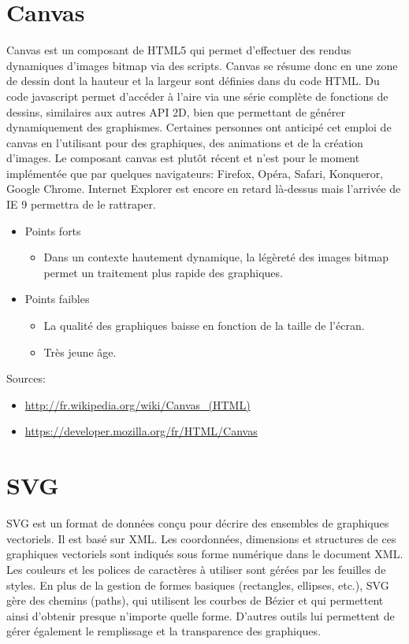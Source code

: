 \documentclass[a4paper,10pt]{report}
\begin{document}
\section{Canvas}
Canvas est un composant de HTML5 qui permet d'effectuer des rendus dynamiques d'images 
bitmap via des scripts.
Canvas se résume donc en une zone de dessin dont la hauteur et la largeur sont définies 
dans du code HTML. Du code javascript permet d'accéder à l'aire via une série complète de fonctions de dessins, 
similaires aux autres API 2D, bien que permettant de générer dynamiquement des graphismes. Certaines personnes ont anticipé cet emploi de canvas en l'utilisant pour des graphiques, des animations et de la création d'images.
Le composant canvas est plutôt récent et n'est pour le moment implémentée que par 
quelques navigateurs: Firefox, Opéra, Safari, Konqueror, Google Chrome. 
Internet Explorer est encore en retard là-dessus mais l'arrivée de IE 9 permettra
 de le rattraper.

\begin{itemize}
  \item{Points forts}
  \begin{itemize}
    \item Dans un contexte hautement dynamique, la légèreté des images bitmap permet un traitement plus rapide des graphiques.
  \end{itemize}
  \item{Points faibles}
  \begin{itemize}
    \item La qualité des graphiques baisse en fonction de la taille de l'écran.
    \item Très jeune âge.
  \end{itemize}
\end{itemize}


 Sources:
\begin{itemize}
\item \url{http://fr.wikipedia.org/wiki/Canvas_(HTML)}
\item \url{https://developer.mozilla.org/fr/HTML/Canvas}
\end{itemize} 
	  

\section{SVG}
SVG est un format de données conçu pour décrire des ensembles de graphiques vectoriels. 
Il est basé sur XML. Les coordonnées, dimensions et structures de ces graphiques 
vectoriels sont indiqués sous forme numérique dans le document XML. 
Les couleurs et les polices de caractères à utiliser sont gérées par 
les feuilles de styles. 
En plus de la gestion de formes basiques (rectangles, ellipses, etc.), SVG gère
 des chemins (paths), qui utilisent les courbes de Bézier et qui permettent ainsi
 d'obtenir presque n'importe quelle forme.  D'autres outils lui permettent de gérer 
également le remplissage et la transparence des graphiques.
\end{document}
